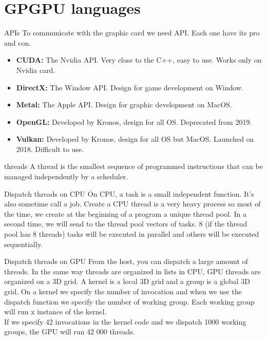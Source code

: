 \documentclass{beamer}
\begin{document}
\section{GPGPU languages}
\begin{frame}{APIs}
	To communicate with the graphic card we need API. Each one have its pro and con.
	\begin{itemize}
		\item \textbf{CUDA:} The Nvidia API. Very close to the C++, easy to use. Works only on Nvidia card.
		\item \textbf{DirectX:} The Window API. Design for game development on Window.
		\item \textbf{Metal:} The Apple API. Design for graphic development on MacOS.
		\item \textbf{OpenGL:} Developed by Kronos, design for all OS. Deprecated from 2019.
		\item \textbf{Vulkan:} Developed by Kronos, design for all OS but MacOS. Launched on 2018. Difficult to use.
	\end{itemize}
\end{frame}

\begin{frame}{threads}
	A thread is the smallest sequence of programmed instructions that can be managed independently by a scheduler.
\end{frame}

\begin{frame}{Dispatch threads on CPU}
	On CPU, a task is a small independent function. It's also sometime call a job. Create a CPU thread is a very heavy process so most of the time, we create at the beginning of a program a unique thread pool. In a second time, we will send to the thread pool vectors of tasks. 8 (if the thread pool has 8 threads) tasks will be executed in parallel and others will be executed sequentially.
\end{frame}

\begin{frame}{Dispatch threads on GPU}
	From the host, you can dispatch a large amount of threads. In the same way threads are organized in lists in CPU, GPU threads are organized on a 3D grid. A kernel is a local 3D grid and a group is a global 3D grid. On a kernel we specify the number of invocation and when we use the dispatch function we specify the number of working group. Each working group will run x instance of the kernel.\\
	If we specify 42 invocations in the kernel code and we dispatch 1000 working groups, the GPU will run 42 000 threads.
\end{frame}
\end{document}
